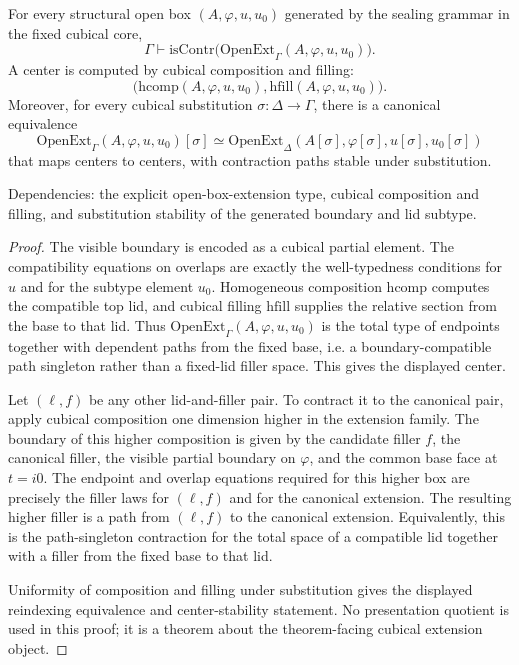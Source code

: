 \documentclass{lmcs}
\newcommand{\hcomp}{\mathrm{hcomp}}
\newcommand{\hfillop}{\mathrm{hfill}}
\newcommand{\OpenExt}{\mathrm{OpenExt}}
\begin{document}
\begin{thm}
\label{thm:open-ext-contr}
For every structural open box \((A,\varphi,u,u_0)\) generated by the sealing grammar in the
fixed cubical core,
\[
  \Gamma \vdash
  \mathrm{isContr}\bigl(\mathrm{OpenExt}_{\Gamma}(A,\varphi,u,u_0)\bigr).
\]
A center is computed by cubical composition and filling:
\[
  \bigl(\hcomp(A,\varphi,u,u_0),
        \hfillop(A,\varphi,u,u_0)\bigr).
\]
Moreover, for every cubical substitution \(\sigma:\Delta\to\Gamma\), there is a canonical
equivalence
\[
  \mathrm{OpenExt}_{\Gamma}(A,\varphi,u,u_0)[\sigma]
  \simeq
  \mathrm{OpenExt}_{\Delta}(A[\sigma],\varphi[\sigma],u[\sigma],u_0[\sigma])
\]
that maps centers to centers, with contraction paths stable under substitution.

Dependencies: the explicit open-box-extension type, cubical composition and filling, and
substitution stability of the generated boundary and lid subtype.
\end{thm}

\begin{proof}
The visible boundary is encoded as a cubical partial element.  The compatibility equations on
overlaps are exactly the well-typedness conditions for \(u\) and for the subtype element
\(u_0\).  Homogeneous composition \(\hcomp\) computes the compatible top lid, and cubical
filling \(\hfillop\) supplies the relative section from the base to that lid.  Thus
\(\OpenExt_\Gamma(A,\varphi,u,u_0)\) is the total type of endpoints together with dependent
paths from the fixed base, i.e. a boundary-compatible path singleton rather than a fixed-lid
filler space.  This gives the displayed center.

Let \((\ell,f)\) be any other lid-and-filler pair.  To contract it to the canonical pair, apply
cubical composition one dimension higher in the extension family.  The boundary of this
higher composition is given by the candidate filler \(f\), the canonical filler, the visible
partial boundary on \(\varphi\), and the common base face at \(t=i0\).  The endpoint and
overlap equations required for this higher box are precisely the filler laws for \((\ell,f)\)
and for the canonical extension.  The resulting higher filler is a path from \((\ell,f)\) to
the canonical extension.  Equivalently, this is the path-singleton contraction for the total
space of a compatible lid together with a filler from the fixed base to that lid.

Uniformity of composition and filling under substitution gives the displayed reindexing
equivalence and center-stability statement.  No presentation quotient is used in this proof;
it is a theorem about the theorem-facing cubical extension object.
\end{proof}
\end{document}
